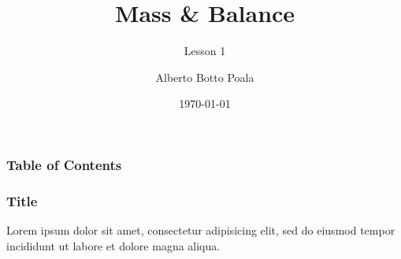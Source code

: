 \documentclass{beamer}
\title{Mass \& Balance}
\subtitle{Lesson 1}
\author{Alberto Botto Poala}
\institute{AeC Biella}
\date{\today}
\begin{document}
\begin{frame}
\titlepage
\end{frame} 

\begin{frame}
\frametitle{Table of Contents}
\tableofcontents
\end{frame} 

\begin{frame}
\frametitle{Title}
Lorem ipsum dolor sit amet, consectetur adipisicing elit, sed do eiusmod tempor incididunt ut labore et dolore magna aliqua.
\end{frame}
\end{document}
